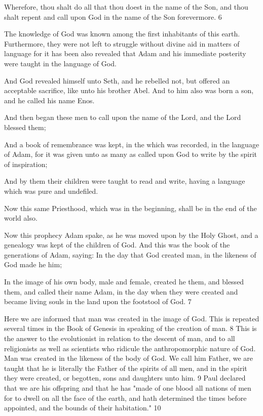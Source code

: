Wherefore, thou shalt do all that thou doest in the name of the Son, and thou shalt repent and
call upon God in the name of the Son forevermore. 6

The knowledge of God was known among the first inhabitants of this earth. Furthermore,
they were not left to struggle without divine aid in matters of language for it has been also
revealed that Adam and his immediate posterity were taught in the language of God.

And God revealed himself unto Seth, and he rebelled not, but offered an acceptable sacrifice,
like unto his brother Abel. And to him also was born a son, and he called his name Enos.

And then began these men to call upon the name of the Lord, and the Lord blessed them;

And a book of remembrance was kept, in the which was recorded, in the language of Adam,
for it was given unto as many as called upon God to write by the spirit of inspiration;

And by them their children were taught to read and write, having a language which was pure
and undefiled.

Now this same Priesthood, which was in the beginning, shall be in the end of the world also.

Now this prophecy Adam spake, as he was moved upon by the Holy Ghost, and a genealogy
was kept of the children of God. And this was the book of the generations of Adam, saying:
In the day that God created man, in the likeness of God made he him;

In the image of his own body, male and female, created he them, and blessed them, and
called their name Adam, in the day when they were created and became living souls in the
land upon the footstool of God. 7

Here we are informed that man was created in the image of God. This is repeated several
times in the Book of Genesis in speaking of the creation of man. 8 This is the answer to the
evolutionist in relation to the descent of man, and to all religionists as well as scientists who
ridicule the anthropomorphic nature of God. Man was created in the likeness of the body of
God. We call him Father, we are taught that he is literally the Father of the spirits of all men,
and in the spirit they were created, or begotten, sons and daughters unto him. 9 Paul declared
that we are his offspring and that he has "made of one blood all nations of men for to dwell
on all the face of the earth, and hath determined the times before appointed, and the bounds
of their habitation." 10

